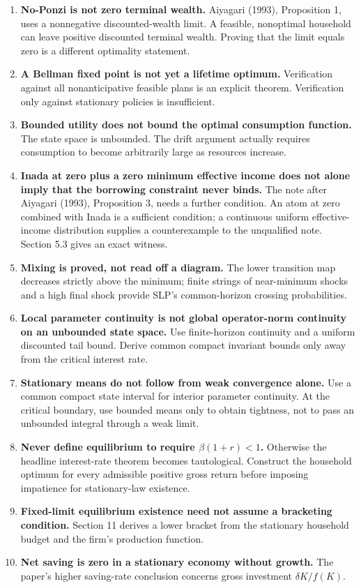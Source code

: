\documentclass[
  11pt,
]{article}
\providecommand{\tightlist}{%
  \setlength{\itemsep}{0pt}\setlength{\parskip}{0pt}}
\begin{document}
\begin{enumerate}
\def\labelenumi{\arabic{enumi}.}
\tightlist
\item
  \textbf{No-Ponzi is not zero terminal wealth.} Aiyagari (1993),
  Proposition 1, uses a nonnegative discounted-wealth limit. A feasible,
  nonoptimal household can leave positive discounted terminal wealth.
  Proving that the limit equals zero is a different optimality
  statement.
\item
  \textbf{A Bellman fixed point is not yet a lifetime optimum.}
  Verification against all nonanticipative feasible plans is an explicit
  theorem. Verification only against stationary policies is
  insufficient.
\item
  \textbf{Bounded utility does not bound the optimal consumption
  function.} The state space is unbounded. The drift argument actually
  requires consumption to become arbitrarily large as resources
  increase.
\item
  \textbf{Inada at zero plus a zero minimum effective income does not
  alone imply that the borrowing constraint never binds.} The note after
  Aiyagari (1993), Proposition 3, needs a further condition. An atom at
  zero combined with Inada is a sufficient condition; a continuous
  uniform effective-income distribution supplies a counterexample to the
  unqualified note. Section 5.3 gives an exact witness.
\item
  \textbf{Mixing is proved, not read off a diagram.} The lower
  transition map decreases strictly above the minimum; finite strings of
  near-minimum shocks and a high final shock provide SLP's
  common-horizon crossing probabilities.
\item
  \textbf{Local parameter continuity is not global operator-norm
  continuity on an unbounded state space.} Use finite-horizon continuity
  and a uniform discounted tail bound. Derive common compact invariant
  bounds only away from the critical interest rate.
\item
  \textbf{Stationary means do not follow from weak convergence alone.}
  Use a common compact state interval for interior parameter continuity.
  At the critical boundary, use bounded means only to obtain tightness,
  not to pass an unbounded integral through a weak limit.
\item
  \textbf{Never define equilibrium to require \(\beta(1+r)<1\).}
  Otherwise the headline interest-rate theorem becomes tautological.
  Construct the household optimum for every admissible positive gross
  return before imposing impatience for stationary-law existence.
\item
  \textbf{Fixed-limit equilibrium existence need not assume a bracketing
  condition.} Section 11 derives a lower bracket from the stationary
  household budget and the firm's production function.
\item
  \textbf{Net saving is zero in a stationary economy without growth.}
  The paper's higher saving-rate conclusion concerns gross investment
  \(\delta K/f(K)\).
\end{enumerate}
\end{document}
